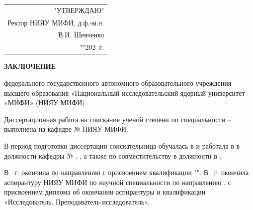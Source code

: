     \begin{table}[h!]
        \raggedleft
            \begin{tabular}{r}
                "УТВЕРЖДАЮ" \\[5pt]
                Ректор НИЯУ МИФИ, д.ф.-м.н. \\[5pt]
                \uline{\hspace{6em}} В.И. Шевченко \\[5pt]
                "\uline{\hspace{1em}}"\uline{\hspace{8em}}202\uline{\hspace{1em}}~г.
            \end{tabular}
    \end{table}

    \vspace{5mm}

    \begin{tightcenter}
        \textbf{ЗАКЛЮЧЕНИЕ}
        
        федерального государственного автономного образовательного учреждения высшего образования «Национальный исследовательский ядерный университет «МИФИ» (НИЯУ МИФИ)

    \end{tightcenter}

    \vspace{5mm}

    Диссертационная работа   на соискание ученой степени  по специальности  –  выполнена на кафедре №   НИЯУ МИФИ.

    В период подготовки диссертации соискательница  обучалась в  и работала в  в должности  кафедры №  
    \ifnum{}
        .
    \else
        , а также по совместительству в должности  в .
    \fi

    В ~г. окончила   по направлению    с присвоением квалификации "". В ~г.  окончила аспирантуру НИЯУ МИФИ по научной специальности   по направлению 
    \ifnum{}
        .
    \else
         с присвоением диплома об окончании аспирантуры и квалификации «Исследователь. Преподаватель-исследователь».
    \fi

